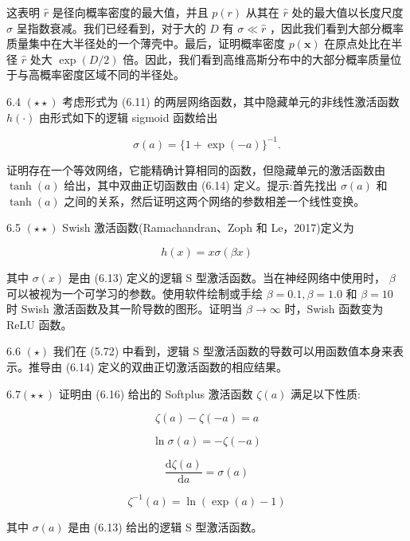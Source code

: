 \documentclass[10pt]{report}
\begin{document}
这表明 \(\widehat{r}\) 是径向概率密度的最大值，并且 \(p\left( r\right)\) 从其在 \(\widehat{r}\) 处的最大值以长度尺度 \(\sigma\) 呈指数衰减。我们已经看到，对于大的 \(D\) 有 \(\sigma  \ll  \widehat{r}\) ，因此我们看到大部分概率质量集中在大半径处的一个薄壳中。最后，证明概率密度 \(p\left( \mathbf{x}\right)\) 在原点处比在半径 \(\widehat{r}\) 处大 \(\exp \left( {D/2}\right)\) 倍。因此，我们看到高维高斯分布中的大部分概率质量位于与高概率密度区域不同的半径处。

6.4 \(\left( {\star  \star  }\right)\) 考虑形式为 (6.11) 的两层网络函数，其中隐藏单元的非线性激活函数 \(h\left( \cdot \right)\) 由形式如下的逻辑 sigmoid 函数给出

\[
\sigma \left( a\right)  = \{ 1 + \exp \left( {-a}\right) {\} }^{-1}. \tag{6.60}
\]

证明存在一个等效网络，它能精确计算相同的函数，但隐藏单元的激活函数由 \(\tanh \left( a\right)\) 给出，其中双曲正切函数由 (6.14) 定义。提示:首先找出 \(\sigma \left( a\right)\) 和 \(\tanh \left( a\right)\) 之间的关系，然后证明这两个网络的参数相差一个线性变换。

6.5 \(\left( {\star  \star  }\right)\) Swish 激活函数(Ramachandran、Zoph 和 Le，2017)定义为

\[
h\left( x\right)  = {x\sigma }\left( {\beta x}\right)  \tag{6.61}
\]

其中 \(\sigma \left( x\right)\) 是由 (6.13) 定义的逻辑 S 型激活函数。当在神经网络中使用时， \(\beta\) 可以被视为一个可学习的参数。使用软件绘制或手绘 \(\beta  = {0.1},\beta  = {1.0}\) 和 \(\beta  = {10}\) 时 Swish 激活函数及其一阶导数的图形。证明当 \(\beta  \rightarrow  \infty\) 时，Swish 函数变为 ReLU 函数。

6.6 \(\left( \star \right)\) 我们在 (5.72) 中看到，逻辑 S 型激活函数的导数可以用函数值本身来表示。推导由 (6.14) 定义的双曲正切激活函数的相应结果。

\({6.7}\left( {\star  \star  }\right)\) 证明由 (6.16) 给出的 Softplus 激活函数 \(\zeta \left( a\right)\) 满足以下性质:

\[
\zeta \left( a\right)  - \zeta \left( {-a}\right)  = a \tag{6.62}
\]

\[
\ln \sigma \left( a\right)  =  - \zeta \left( {-a}\right)  \tag{6.63}
\]

\[
\frac{\mathrm{d}\zeta \left( a\right) }{\mathrm{d}a} = \sigma \left( a\right)  \tag{6.64}
\]

\[
{\zeta }^{-1}\left( a\right)  = \ln \left( {\exp \left( a\right)  - 1}\right)  \tag{6.65}
\]

其中 \(\sigma \left( a\right)\) 是由 (6.13) 给出的逻辑 S 型激活函数。
\end{document}
